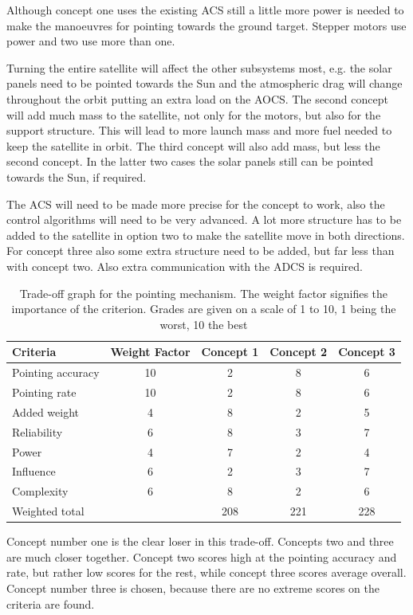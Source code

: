Although concept one uses the existing \ac{ACS} still a little more power is needed to make the manoeuvres for pointing towards the ground target. Stepper motors use power and two use more than one.

Turning the entire satellite will affect the other subsystems most, e.g. the solar panels need to be pointed towards the Sun and the atmospheric drag will change throughout the orbit putting an extra load on the \ac{AOCS}. The second concept will add much mass to the satellite, not only for the motors, but also for the support structure. This will lead to more launch mass and more fuel needed to keep the satellite in orbit. The third concept will also add mass, but less the second concept. In the latter two cases the solar panels still can be pointed towards the Sun, if required.

The \ac{ACS} will need to be made more precise for the concept to work, also the control algorithms will need to be very advanced. A lot more structure has to be added to the satellite in option two to make the satellite move in both directions. For concept three also some extra structure need to be added, but far less than with concept two. Also extra communication with the \ac{ADCS} is required.

\begin{table} [h]
\centering
\begin{tabular}{p{3cm} | c | c c c}
\textbf{Criteria} & \textbf{Weight Factor} & \textbf{Concept 1} & \textbf{Concept 2} & \textbf{Concept 3} \\ \hline \hline
Pointing accuracy & 10 & 2 & 8 & 6 \\
Pointing rate     & 10 & 2 & 8 & 6 \\
Added weight      & 4  & 8 & 2 & 5 \\
Reliability       & 6  & 8 & 3 & 7 \\
Power             & 4  & 7 & 2 & 4 \\
Influence         & 6  & 2 & 3 & 7 \\
Complexity        & 6  & 8 & 2 & 6 \\ \hline
Weighted total    &    & 208 & 221 & 228
\end{tabular} 
\caption[Trade-off pointing mechanism]{Trade-off graph for the pointing mechanism. The weight factor signifies the importance of the criterion. Grades are given on a scale of 1 to 10, 1 being the worst, 10 the best}
\label{tab:pointingtradeoff}
\end{table}

Concept number one is the clear loser in this trade-off. Concepts two and three are much closer together. Concept two scores high at the pointing accuracy and rate, but rather low scores for the rest, while concept three scores average overall. 
Concept number three is chosen, because there are no extreme scores on the criteria are found.